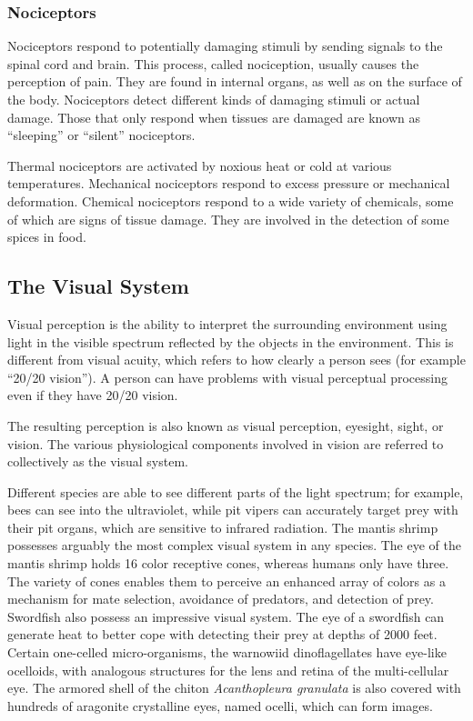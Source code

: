 \hypertarget{nociceptors}{%
\subsubsection{Nociceptors}\label{nociceptors}}

Nociceptors respond to potentially damaging stimuli by sending signals
to the spinal cord and brain. This process, called nociception, usually
causes the perception of pain. They are found in internal organs, as
well as on the surface of the body. Nociceptors detect different kinds
of damaging stimuli or actual damage. Those that only respond when
tissues are damaged are known as ``sleeping'' or ``silent'' nociceptors.

Thermal nociceptors are activated by noxious heat or cold at various
temperatures. Mechanical nociceptors respond to excess pressure or
mechanical deformation. Chemical nociceptors respond to a wide variety
of chemicals, some of which are signs of tissue damage. They are
involved in the detection of some spices in food.

\hypertarget{the-visual-system}{%
\subsection{The Visual System}\label{the-visual-system}}

Visual perception is the ability to interpret the surrounding
environment using light in the visible spectrum reflected by the objects
in the environment. This is different from visual acuity, which refers
to how clearly a person sees (for example ``20/20 vision''). A person
can have problems with visual perceptual processing even if they have
20/20 vision.

The resulting perception is also known as visual perception, eyesight,
sight, or vision. The various physiological components involved in
vision are referred to collectively as the visual system.

Different species are able to see different parts of the light spectrum;
for example, bees can see into the ultraviolet, while pit vipers can
accurately target prey with their pit organs, which are sensitive to
infrared radiation. The mantis shrimp possesses arguably the most
complex visual system in any species. The eye of the mantis shrimp holds
16 color receptive cones, whereas humans only have three. The variety of
cones enables them to perceive an enhanced array of colors as a
mechanism for mate selection, avoidance of predators, and detection of
prey. Swordfish also possess an impressive visual system. The eye of a
swordfish can generate heat to better cope with detecting their prey at
depths of 2000 feet. Certain one-celled micro-organisms, the warnowiid
dinoflagellates have eye-like ocelloids, with analogous structures for
the lens and retina of the multi-cellular eye. The armored shell of the
chiton \emph{Acanthopleura granulata} is also covered with hundreds of
aragonite crystalline eyes, named ocelli, which can form images.

